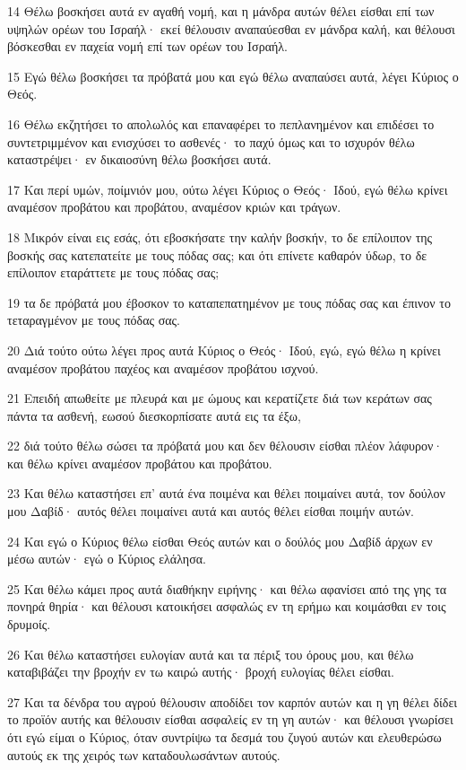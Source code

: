 \par 14 Θέλω βοσκήσει αυτά εν αγαθή νομή, και η μάνδρα αυτών θέλει είσθαι επί των υψηλών ορέων του Ισραήλ· εκεί θέλουσιν αναπαύεσθαι εν μάνδρα καλή, και θέλουσι βόσκεσθαι εν παχεία νομή επί των ορέων του Ισραήλ.
\par 15 Εγώ θέλω βοσκήσει τα πρόβατά μου και εγώ θέλω αναπαύσει αυτά, λέγει Κύριος ο Θεός.
\par 16 Θέλω εκζητήσει το απολωλός και επαναφέρει το πεπλανημένον και επιδέσει το συντετριμμένον και ενισχύσει το ασθενές· το παχύ όμως και το ισχυρόν θέλω καταστρέψει· εν δικαιοσύνη θέλω βοσκήσει αυτά.
\par 17 Και περί υμών, ποίμνιόν μου, ούτω λέγει Κύριος ο Θεός· Ιδού, εγώ θέλω κρίνει αναμέσον προβάτου και προβάτου, αναμέσον κριών και τράγων.
\par 18 Μικρόν είναι εις εσάς, ότι εβοσκήσατε την καλήν βοσκήν, το δε επίλοιπον της βοσκής σας κατεπατείτε με τους πόδας σας; και ότι επίνετε καθαρόν ύδωρ, το δε επίλοιπον εταράττετε με τους πόδας σας;
\par 19 τα δε πρόβατά μου έβοσκον το καταπεπατημένον με τους πόδας σας και έπινον το τεταραγμένον με τους πόδας σας.
\par 20 Διά τούτο ούτω λέγει προς αυτά Κύριος ο Θεός· Ιδού, εγώ, εγώ θέλω η κρίνει αναμέσον προβάτου παχέος και αναμέσον προβάτου ισχνού.
\par 21 Επειδή απωθείτε με πλευρά και με ώμους και κερατίζετε διά των κεράτων σας πάντα τα ασθενή, εωσού διεσκορπίσατε αυτά εις τα έξω,
\par 22 διά τούτο θέλω σώσει τα πρόβατά μου και δεν θέλουσιν είσθαι πλέον λάφυρον· και θέλω κρίνει αναμέσον προβάτου και προβάτου.
\par 23 Και θέλω καταστήσει επ' αυτά ένα ποιμένα και θέλει ποιμαίνει αυτά, τον δούλον μου Δαβίδ· αυτός θέλει ποιμαίνει αυτά και αυτός θέλει είσθαι ποιμήν αυτών.
\par 24 Και εγώ ο Κύριος θέλω είσθαι Θεός αυτών και ο δούλός μου Δαβίδ άρχων εν μέσω αυτών· εγώ ο Κύριος ελάλησα.
\par 25 Και θέλω κάμει προς αυτά διαθήκην ειρήνης· και θέλω αφανίσει από της γης τα πονηρά θηρία· και θέλουσι κατοικήσει ασφαλώς εν τη ερήμω και κοιμάσθαι εν τοις δρυμοίς.
\par 26 Και θέλω καταστήσει ευλογίαν αυτά και τα πέριξ του όρους μου, και θέλω καταβιβάζει την βροχήν εν τω καιρώ αυτής· βροχή ευλογίας θέλει είσθαι.
\par 27 Και τα δένδρα του αγρού θέλουσιν αποδίδει τον καρπόν αυτών και η γη θέλει δίδει το προϊόν αυτής και θέλουσιν είσθαι ασφαλείς εν τη γη αυτών· και θέλουσι γνωρίσει ότι εγώ είμαι ο Κύριος, όταν συντρίψω τα δεσμά του ζυγού αυτών και ελευθερώσω αυτούς εκ της χειρός των καταδουλωσάντων αυτούς.
